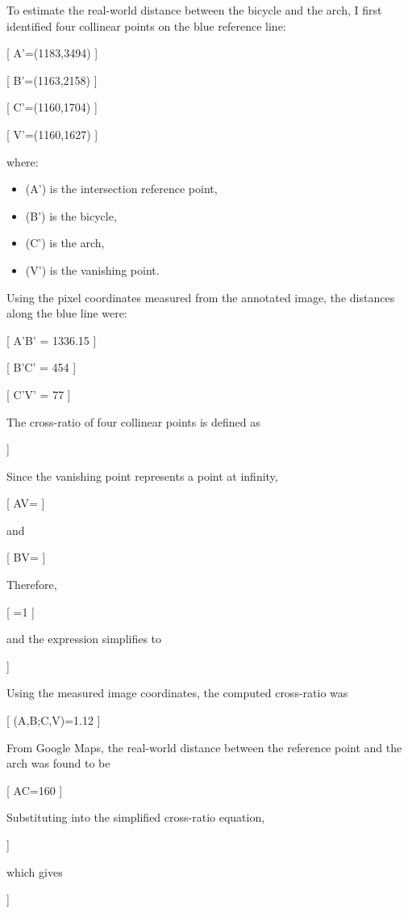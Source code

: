 \begin{studentSpace}

To estimate the real-world distance between the bicycle and the arch, I first identified four collinear points on the blue reference line:

[
A'=(1183,3494)
]

[
B'=(1163,2158)
]

[
C'=(1160,1704)
]

[
V'=(1160,1627)
]

where:

\begin{itemize}
\item (A') is the intersection reference point,
\item (B') is the bicycle,
\item (C') is the arch,
\item (V') is the vanishing point.
\end{itemize}

Using the pixel coordinates measured from the annotated image, the distances along the blue line were:

[
A'B' = 1336.15
]

[
B'C' = 454
]

[
C'V' = 77
]

The cross-ratio of four collinear points is defined as

\cdot
{}
]

Since the vanishing point represents a point at infinity,

[
AV=\infty
]

and

[
BV=\infty
]

Therefore,

[
=1
]

and the expression simplifies to

]

Using the measured image coordinates, the computed cross-ratio was

[
(A,B;C,V)=1.12
]

From Google Maps, the real-world distance between the reference point and the arch was found to be

[
AC=160
]

Substituting into the simplified cross-ratio equation,

]

which gives

]


\end{studentSpace}
